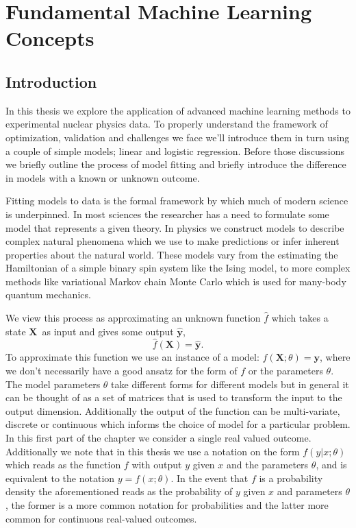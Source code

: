 \chapter{Fundamental Machine Learning Concepts}\label{chap:fundament}
\section{Introduction}\label{sec:fundament_intro}

In this thesis we explore the application of advanced machine learning methods to experimental nuclear physics data. To properly understand the framework of optimization, validation and challenges we face we'll introduce them in turn using a couple of simple models; linear and logistic regression. Before those discussions we briefly outline the process of model fitting and briefly introduce the difference in models with a known or unknown outcome.

Fitting models to data is the formal framework by which much of modern science is underpinned. In most sciences the researcher has a need to formulate some model that represents a given theory. In physics we construct models to describe complex natural phenomena which we use to make predictions or infer inherent properties about the natural world. These models vary from the estimating the Hamiltonian of a simple binary spin system like the Ising model, to more complex methods like variational Markov chain Monte Carlo which is used for many-body quantum mechanics.

We view this process as approximating an unknown function $\hat{f}$ which takes a state $\mathbf{X}$ as input and gives some output $\mathbf{\hat{y}}$,  
 $$\hat{f}(\mathbf{X}) = \mathbf{\hat{y}}.$$ 
To approximate this function we use an instance of a model: $f(\mathbf{X}; \theta) = \mathbf{y}$, where we don't necessarily have a good ansatz for the form of $f$ or the parameters $\theta$. The model parameters $\theta$ take different forms for different models but in general it can be thought of as a set of matrices that is used to transform the input to the output dimension. Additionally the output of the function can be multi-variate, discrete or continuous which informs the choice of model for a particular problem. In this first part of the chapter we consider a single real valued outcome. Additionally we note  that in this thesis we use a notation on the form $f(y | x; \theta )$ which reads as the function $f$ with output $y$ given $x$ and the parameters $\theta$, and is equivalent to the notation $y = f(x; \theta)$. In the event that $f$ is a probability density the aforementioned reads as the probability of $y$ given $x$ and parameters $\theta$, the former is a more common notation for probabilities and the latter more common for continuous real-valued outcomes. 


